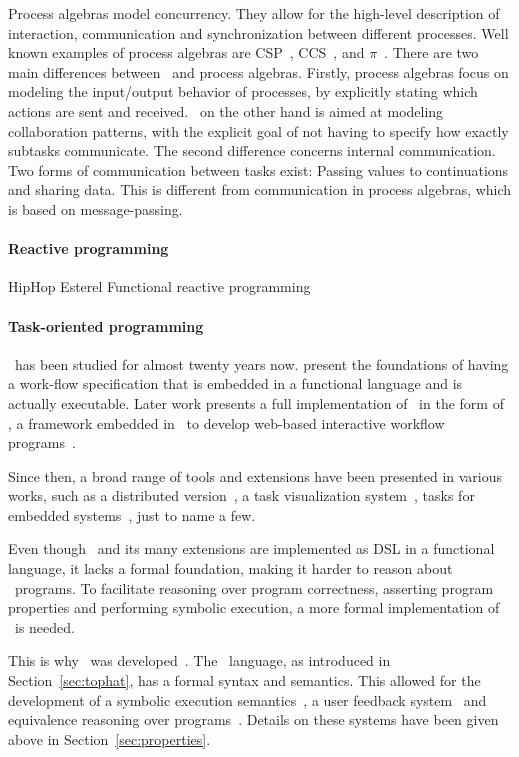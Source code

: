 Process algebras model concurrency.
They allow for the high-level description of interaction, communication and synchronization between different processes.
Well known examples of process algebras are CSP~\cite{books/ph/Hoare85}, CCS~\cite{books/ph/Milner89}, and $\pi$~\cite{DBLP:books/daglib/0098267}.
There are two main differences between \TOP\ and process algebras.
Firstly, process algebras focus on modeling the input/output behavior of processes, by explicitly stating which actions are sent and received.
\TOP\ on the other hand is aimed at modeling collaboration patterns, with the explicit goal of not having to specify how exactly subtasks communicate.
The second difference concerns internal communication.
Two forms of communication between tasks exist: Passing values to continuations and sharing data.
This is different from communication in process algebras, which is based on message-passing.

\paragraph{Reactive programming}
HipHop
Esterel
Functional reactive programming

\paragraph{Task-oriented programming}

\TOP\ has been studied for almost twenty years now.
\citet{conf/icfp/PlasmeijerAK07} present the foundations of having a work-flow specification that is embedded in a functional language and is actually executable.
Later work presents a full implementation of \TOP\ in the form of \ITASKS, a framework embedded in \CLEAN\ to develop web-based interactive workflow programs~\cite{conf/ppdp/PlasmeijerLMAK12}.

Since then, a broad range of tools and extensions have been presented in various works, such as a distributed version~\cite{conf/ifl/OortgieseGAP17}, a task visualization system~\cite{conf/sfp/StutterheimPA14,conf/cefp/StutterheimAP15}, tasks for embedded systems~\cite{conf/cgo/KoopmanLP18,conf/ifl/LubbersKP18,conf/mipro/LubbersKP19,conf/ifl/LubbersKP19}, just to name a few.

Even though \ITASKS\ and its many extensions are implemented as DSL in a functional language, it lacks a formal foundation, making it harder to reason about \TOP\ programs.
To facilitate reasoning over program correctness, asserting program properties and performing symbolic execution, a more formal implementation of \TOP\ is needed.

This is why \TOPHAT\ was developed~\cite{conf/ppdp/SteenvoordenNK19}.
The \TOPHAT\ language, as introduced in Section~\ref{sec:tophat}, has a formal syntax and semantics.
This allowed for the development of a symbolic execution semantics~\cite{conf/ifl/NausSK19}, a user feedback system~\cite{conf/sfp/NausS20} and equivalence reasoning over programs~\cite{conf/sfp/KlijnsmaS22}.
Details on these systems have been given above in Section~\ref{sec:properties}.